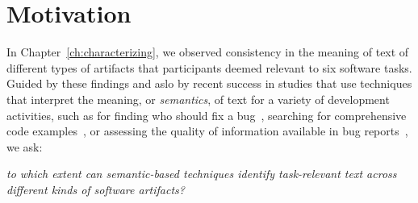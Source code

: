 
\section{Motivation}
\label{cp5:motivation}









In Chapter~\ref{ch:characterizing},
we observed consistency in the meaning of text of 
different types of artifacts that  
participants deemed relevant to six software tasks.
Guided by these findings and aslo by recent success 
in studies that use techniques that interpret the meaning, or \textit{semantics}, of text
for a variety of development activities, such as
for finding who should fix a bug~\cite{yang2016}, searching for comprehensive code examples~\cite{silva2019}, 
or assessing the quality of information available in bug reports~\cite{chaparro2019}, we ask:



\medskip
\begin{bluequote}
    \textit{to which extent can semantic-based techniques identify task-relevant text across different kinds of software artifacts?}
\end{bluequote}




